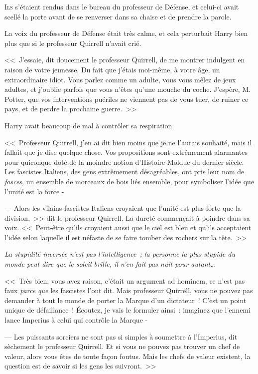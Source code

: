 
\lettrine{I}{ls} s'étaient rendus dans le bureau du professeur de Défense, et celui-ci avait scellé la porte avant de se renverser dans sa chaise et de prendre la parole.

La voix du professeur de Défense était très calme, et cela perturbait Harry bien plus que si le professeur Quirrell n'avait crié.

<<~J'essaie, dit doucement le professeur Quirrell, de me montrer indulgent en raison de votre jeunesse. Du fait que j'étais moi-même, à votre âge, un extraordinaire idiot. Vous parlez comme un adulte, vous vous mêlez de jeux adultes, et j'oublie parfois que vous n'êtes qu'une mouche du coche. J'espère, M. Potter, que vos interventions puériles ne viennent pas de vous tuer, de ruiner ce pays, et de perdre la prochaine guerre.~>>

Harry avait beaucoup de mal à contrôler sa respiration.

<<~Professeur Quirrell, j'en ai dit bien moins que je ne l'aurais souhaité, mais il fallait que je dise quelque chose. Vos propositions sont extrêmement alarmantes pour quiconque doté de la moindre notion d'Histoire Moldue du dernier siècle. Les fascistes Italiens, des gens extrêmement désagréables, ont pris leur nom de \emph{fasces}, un ensemble de morceaux de bois liés ensemble, pour symboliser l'idée que l'unité est la force -

--- Alors les vilains fascistes Italiens croyaient que l'unité est plus forte que la division,~>> dit le professeur Quirrell. La dureté commençait à poindre dans sa voix. <<~Peut-être qu'ils croyaient aussi que le ciel est bleu et qu'ils acceptaient l'idée selon laquelle il est néfaste de se faire tomber des rochers sur la tête.~>>

\emph{La stupidité inversée n'est pas l'intelligence~; la personne la plus stupide du monde peut dire que le soleil brille, il n'en fait pas nuit pour autant…}

<<~Très bien, vous avez raison, c'était un argument ad hominem, ce n'est pas faux \emph{parce que} les fascistes l'ont dit. Mais professeur Quirrell, vous ne pouvez pas demander à tout le monde de porter la Marque d'un dictateur~! C'est un point unique de défaillance~! Écoutez, je vais le formuler ainsi~: imaginez que l'ennemi lance Imperius à celui qui contrôle la Marque -

--- Les puissants sorciers ne sont pas si simples à soumettre à l'Imperius, dit sèchement le professeur Quirrell. Et si vous ne pouvez pas trouver un chef de valeur, alors vous êtes de toute façon foutus. Mais les chefs de valeur existent, la question est de savoir si les gens les suivront.~>>

